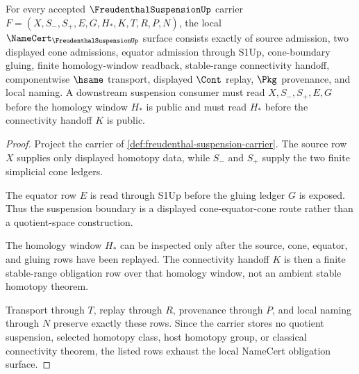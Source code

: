 \begin{theorem}
\label{thm:freudenthal-suspension-namecert-obligations}
For every accepted $\FreudenthalSuspensionUp$ carrier $F=(X,S_-,S_+,E,G,H_*,K,T,R,P,N)$, the local $\NameCert_{\FreudenthalSuspensionUp}$ surface consists exactly of source admission, two displayed cone admissions, equator admission through S1Up, cone-boundary gluing, finite homology-window readback, stable-range connectivity handoff, componentwise $\hsame$ transport, displayed $\Cont$ replay, $\Pkg$ provenance, and local naming. A downstream suspension consumer must read $X,S_-,S_+,E,G$ before the homology window $H_*$ is public and must read $H_*$ before the connectivity handoff $K$ is public.
\end{theorem}
\begin{proof}
Project the carrier of \autoref{def:freudenthal-suspension-carrier}. The source row $X$ supplies only displayed homotopy data, while $S_-$ and $S_+$ supply the two finite simplicial cone ledgers.

The equator row $E$ is read through S1Up before the gluing ledger $G$ is exposed. Thus the suspension boundary is a displayed cone-equator-cone route rather than a quotient-space construction.

The homology window $H_*$ can be inspected only after the source, cone, equator, and gluing rows have been replayed. The connectivity handoff $K$ is then a finite stable-range obligation row over that homology window, not an ambient stable homotopy theorem.

Transport through $T$, replay through $R$, provenance through $P$, and local naming through $N$ preserve exactly these rows. Since the carrier stores no quotient suspension, selected homotopy class, host homotopy group, or classical connectivity theorem, the listed rows exhaust the local NameCert obligation surface.
\end{proof}

